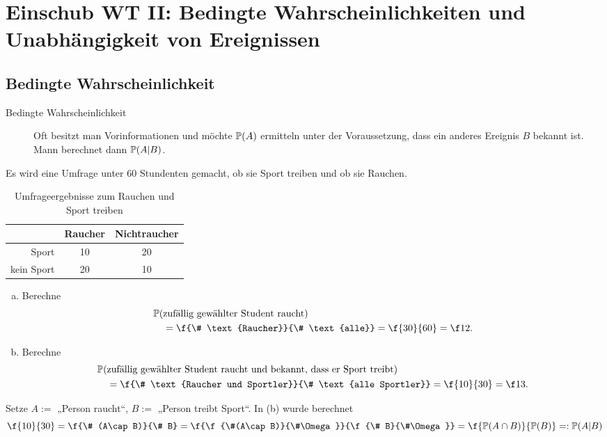 \section{Einschub WT II: Bedingte Wahrscheinlichkeiten und Unabhängigkeit von Ereignissen}


\subsection{Bedingte Wahrscheinlichkeit}

\begin{description}
	\item[Bedingte Wahrscheinlichkeit]
		Oft besitzt man Vorinformationen und möchte $\P(A)$ ermitteln unter der Voraussetzung, dass ein anderes Ereignis $B$ bekannt ist.
		Mann berechnet dann $\P(A|B)$.
\end{description}

\begin{ex} \label{1.5.1}
	Es wird eine Umfrage unter 60 Stundenten gemacht, ob sie Sport treiben und ob sie Rauchen.
	\begin{table}[H]
		\centering
		\caption{Umfrageergebnisse zum Rauchen und Sport treiben}
		\begin{tabular}{r|cc}
			& Raucher & Nichtraucher \\\hline
			Sport & 10 & 20 \\
			kein Sport & 20 & 10
		\end{tabular}
	\end{table}
	\begin{enumerate}[(a)]
		\item
			Berechne
			\begin{align*}
				&\P(\text{zufällig gewählter Student raucht}) \\
				&\quad= \f {\# \text{Raucher}}{\# \text{alle}}
				= \f {30}{60}
				= \f 12.
			\end{align*}
		\item
			Berechne
			\begin{align*}
				&\P(\text{zufällig gewählter Student raucht und bekannt, dass er Sport treibt}) \\
				&\quad= \f {\# \text{Raucher und Sportler}}{\# \text{alle Sportler}}
				= \f {10}{30}
				= \f 13.
			\end{align*}
	\end{enumerate}
	Setze $A := $ „Person raucht“, $B := $ „Person treibt Sport“.
	In (b) wurde berechnet
	\[
		\f {10}{30}
		= \f {\# (A\cap B)}{\# B}
		= \f {\f{\#(A\cap B)}{\#\Omega}}{\f {\# B}{\#\Omega}}
		= \f {\P(A \cap B)}{\P(B)}
		=: \P(A|B)
	\]
\end{ex}

